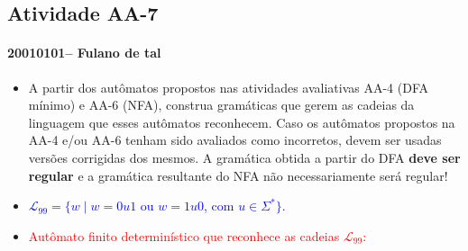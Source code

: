 \documentclass[12pt]{article}
\def\discente{Fulano de tal}
\def\matricula{20010101}
\def\aa{7}
\def\myling{{99}} %
\begin{document}
\subsection*{Atividade AA-\aa}
 \paragraph{\matricula -- \discente}
%
 \begin{itemize}
  \item A partir dos autômatos propostos nas atividades avaliativas AA-4 (DFA mínimo) e AA-6 (NFA), construa gramáticas que gerem as cadeias da linguagem que esses autômatos reconhecem. Caso os autômatos propostos na AA-4 e/ou AA-6 tenham sido avaliados como incorretos, devem ser usadas versões corrigidas dos mesmos.  A gramática obtida a partir do DFA \textbf{deve ser regular} e a gramática resultante do NFA não necessariamente será regular! 
  \item \textcolor{blue}{$\mathcal{L}_\myling = \{w\mid w=0u1$ ou $w=1u0$, com $u\in\Sigma^*\}$.}
  \item  \textcolor{red}{Autômato finito determinístico que reconhece as cadeias $\mathcal{L}_\myling$:}
\begin{center}
\end{center}
\end{itemize}
\end{document}
